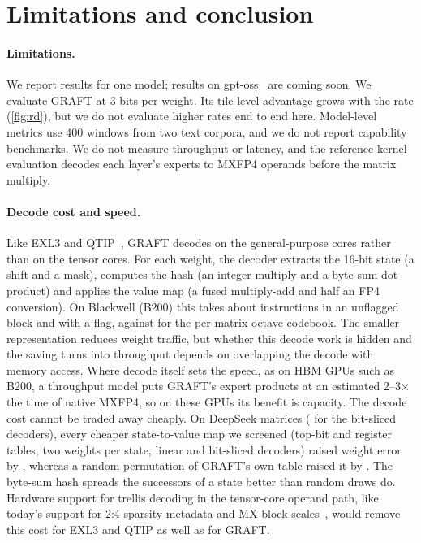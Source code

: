 \section{Limitations and conclusion}
\label{sec:conclusion}

\paragraph{Limitations.} We report results for one model; results on gpt-oss~\citep{gptoss} are coming soon. We
evaluate GRAFT at 3 bits per weight. Its tile-level advantage grows with the rate (\cref{fig:rd}), but we do not
evaluate higher rates end to end here. Model-level metrics use 400 windows from two text corpora, and we do not report
capability benchmarks. We do not measure throughput or latency, and the reference-kernel evaluation decodes each
layer's experts to MXFP4 operands before the matrix multiply.

\paragraph{Decode cost and speed.} Like EXL3 and QTIP~\citep{exllamav3,tseng2024qtip}, GRAFT decodes on the
general-purpose cores rather than on the tensor cores. For each weight, the decoder extracts the 16-bit state (a shift
and a mask), computes the hash (an integer multiply and a byte-sum dot product) and applies the value map (a fused
multiply-add and half an FP4 conversion). On Blackwell (B200) this takes about  instructions in an
unflagged block and  with a flag, against  for the per-matrix octave codebook.
The smaller representation reduces weight traffic, but whether this decode work is hidden and the saving turns into
throughput depends on overlapping the decode with memory access. Where decode itself sets the speed, as on HBM GPUs such as B200, a throughput model puts GRAFT's expert
products at an estimated 2--3$\times$ the time of native MXFP4, so on these GPUs its benefit is capacity. The decode
cost cannot be traded away cheaply. On  DeepSeek matrices ( for the bit-sliced
decoders), every cheaper state-to-value map we screened (top-bit and register tables, two weights per state, linear and
bit-sliced decoders) raised weight error by , whereas a random permutation of GRAFT's own table raised
it by . The byte-sum hash spreads the successors of a state better than random draws do. Hardware support
for trellis decoding in the tensor-core operand path, like today's support for 2:4 sparsity metadata and MX block
scales~\citep{rouhani2023mx}, would remove this cost for EXL3 and QTIP as well as for GRAFT.


